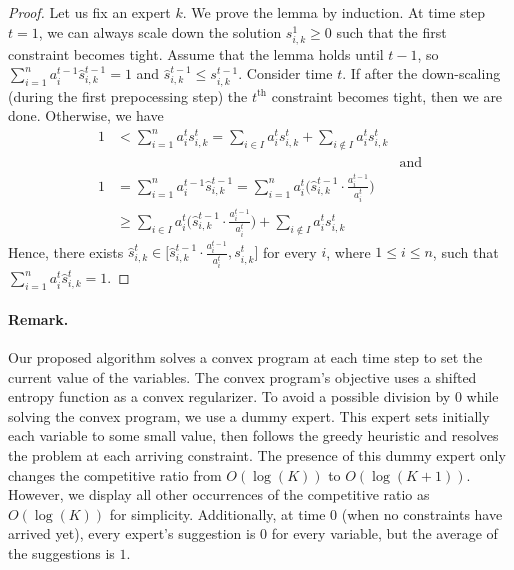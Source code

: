 \begin{proof}
Let us fix an expert $k$. We prove the lemma by induction. At time step $t=1$, we can always scale down the solution $s_{i,k}^{1} \geq 0$ such that the first constraint becomes tight.
Assume that the lemma holds until $t-1$, so $\sum_{i=1}^{n} a_{i}^{t-1} \hat{s}_{i,k}^{t-1} = 1$ and $\hat{s}_{i,k}^{t-1} \leq s_{i,k}^{t-1}$.
Consider time $t$. If after the down-scaling (during the first prepocessing step) the $t^{\text{th}}$ constraint becomes tight, then we are done. Otherwise, we have
	\begin{align*}
		1 &< \sum_{i=1}^{n} a_{i}^{t} s_{i,k}^{t} = \sum_{i \in I} a_{i}^{t} s_{i,k}^{t} + \sum_{i \notin I} a_{i}^{t} s_{i,k}^{t}  & \\
		& & \text{and} \\
		1 &= \sum_{i=1}^{n} a_{i}^{t-1} \hat{s}_{i,k}^{t-1} =  \sum_{i = 1}^{n} a_{i}^{t} \biggl( \hat{s}_{i,k}^{t-1} \cdot \frac{a_{i}^{t-1}}{a_{i}^{t}} \biggr) & \\
		&\geq  \sum_{i \in I} a_{i}^{t} \biggl( \hat{s}_{i,k}^{t-1} \cdot \frac{a_{i}^{t-1}}{a_{i}^{t}} \biggr)
		+ \sum_{i \notin I} a_{i}^{t} s_{i,k}^{t} &
	\end{align*}
	Hence, there exists $\hat{s}_{i,k}^{t} \in \bigl[ \hat{s}_{i,k}^{t-1} \cdot \frac{a_{i}^{t-1}}{a_{i}^{t}}, s_{i,k}^{t} \bigr]$ for every $i$, where $1 \leq i \leq n$, such that $\sum_{i=1}^{n} a_{i}^{t} \hat{s}_{i,k}^{t} = 1$.
\end{proof}

\noindent \paragraph{Remark.} Our proposed algorithm solves a convex program at each time step to set the current value of the variables. The convex program's objective uses a shifted entropy function as a convex regularizer. To avoid a possible division by $0$ while solving the convex program, we use a dummy expert. This expert sets initially each variable to some small value, then follows the greedy heuristic and resolves the problem at each arriving constraint. The presence of this dummy expert only changes the competitive ratio from $O(\log(K))$ to $O(\log(K + 1))$. However, we display all other occurrences of the competitive ratio as $O(\log(K))$ for simplicity. Additionally, at time $0$ (when no constraints have arrived yet), every expert's suggestion is $0$ for every variable, but the average of the suggestions is $1$.

